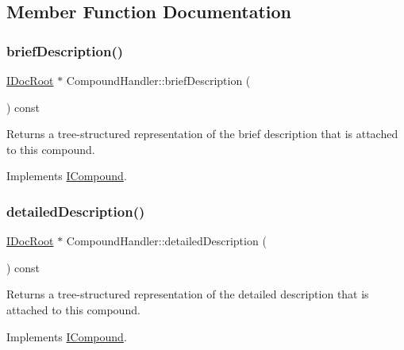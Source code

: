 \subsection{Member Function Documentation}
\mbox{\label{class_compound_handler_a082a2132828d9949c5889a7d5a225b01}} 
\subsubsection{\texorpdfstring{briefDescription()}{briefDescription()}}
{\footnotesize\ttfamily \mbox{\hyperlink{class_i_doc_root}{I\+Doc\+Root}} $\ast$ Compound\+Handler\+::brief\+Description (\begin{DoxyParamCaption}{ }\end{DoxyParamCaption}) const\hspace{0.3cm}{\ttfamily [virtual]}}

Returns a tree-\/structured representation of the brief description that is attached to this compound. 

Implements \mbox{\hyperlink{class_i_compound_a1ac3073130ef6bdd552c275e488c0658}{I\+Compound}}.

\mbox{\label{class_compound_handler_a59b5dcb1da507d212bfc09323832a7b5}} 
\subsubsection{\texorpdfstring{detailedDescription()}{detailedDescription()}}
{\footnotesize\ttfamily \mbox{\hyperlink{class_i_doc_root}{I\+Doc\+Root}} $\ast$ Compound\+Handler\+::detailed\+Description (\begin{DoxyParamCaption}{ }\end{DoxyParamCaption}) const\hspace{0.3cm}{\ttfamily [virtual]}}

Returns a tree-\/structured representation of the detailed description that is attached to this compound. 

Implements \mbox{\hyperlink{class_i_compound_a9630b083767887a40040cb4408d538cd}{I\+Compound}}.


